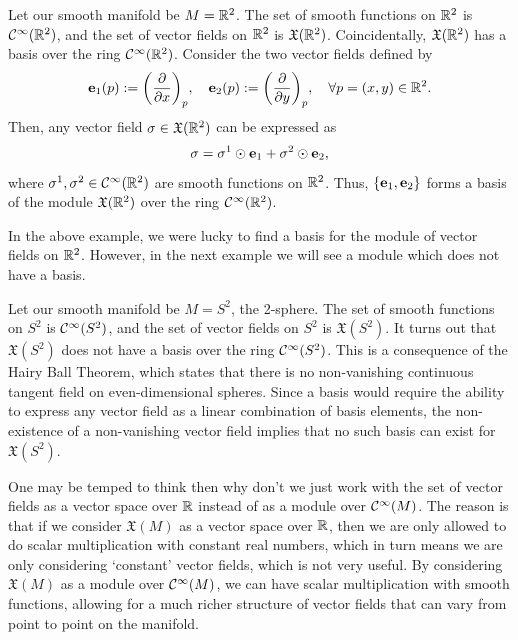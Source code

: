 \begin{example}
	Let our smooth manifold be \(M = \mathbb R^2\). The set of smooth functions on \(\mathbb R^2\) is \(\mathcal C^\infty(\mathbb R^2)\), and the set of vector fields on \(\mathbb R^2\) is \(\mathfrak{X}(\mathbb R^2)\). Coincidentally, \(\mathfrak{X}(\mathbb R^2)\) has a basis over the ring \(\mathcal C^\infty(\mathbb R^2)\). Consider the two vector fields defined by
	\begin{equation*}
		\vb{e}_1(p) := \qty(\pdv{x})_p, \quad \vb{e}_2(p) := \qty(\pdv{y})_p, \quad \forall p = (x, y) \in \mathbb R^2.
	\end{equation*}
	Then, any vector field \(\sigma \in \mathfrak{X}(\mathbb R^2)\) can be expressed as
	\begin{equation*}
		\sigma = \sigma^1 \odot \vb{e}_1 + \sigma^2 \odot \vb{e}_2,
	\end{equation*}
	where \(\sigma^1, \sigma^2 \in \mathcal C^\infty(\mathbb R^2)\) are smooth functions on \(\mathbb R^2\). Thus, \(\{\vb{e}_1, \vb{e}_2\}\) forms a basis of the module \(\mathfrak{X}(\mathbb R^2)\) over the ring \(\mathcal C^\infty(\mathbb R^2)\).
\end{example}
In the above example, we were lucky to find a basis for the module of vector fields on \(\mathbb R^2\). However, in the next example we will see a module which does not have a basis.
\begin{example}
	Let our smooth manifold be \(M = S^2\), the 2-sphere. The set of smooth functions on \(S^2\) is \(\mathcal C^\infty(S^2)\), and the set of vector fields on \(S^2\) is \(\mathfrak{X}(S^2)\). It turns out that \(\mathfrak{X}(S^2)\) does not have a basis over the ring \(\mathcal C^\infty(S^2)\). This is a consequence of the Hairy Ball Theorem, which states that there is no non-vanishing continuous tangent field on even-dimensional spheres. Since a basis would require the ability to express any vector field as a linear combination of basis elements, the non-existence of a non-vanishing vector field implies that no such basis can exist for \(\mathfrak{X}(S^2)\).
\end{example}
One may be temped to think then why don't we just work with the set of vector fields as a vector space over \(\mathbb R\) instead of as a module over \(\mathcal C^\infty(M)\). The reason is that if we consider \(\mathfrak{X}(M)\) as a vector space over \(\mathbb R\), then we are only allowed to do scalar multiplication with constant real numbers, which in turn means we are only considering `constant' vector fields, which is not very useful. By considering \(\mathfrak{X}(M)\) as a module over \(\mathcal C^\infty(M)\), we can have scalar multiplication with smooth functions, allowing for a much richer structure of vector fields that can vary from point to point on the manifold.

